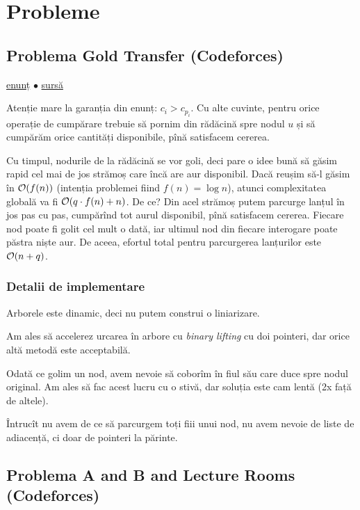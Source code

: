 \documentclass[../main.tex]{subfiles}
\begin{document}
\section{Probleme}

\subsection{Problema Gold Transfer (Codeforces)}
\label{problem:gold-transfer}

\href{https://codeforces.com/contest/1535/problem/E}{enunț}
$\bullet$
\hyperref[code:gold-transfer]{sursă}

Atenție mare la garanția din enunț: $c_i > c_{p_i}$. Cu alte cuvinte, pentru orice operație de cumpărare trebuie să pornim din rădăcină spre nodul $u$ și să cumpărăm orice cantități disponibile, pînă satisfacem cererea.

Cu timpul, nodurile de la rădăcină se vor goli, deci pare o idee bună să găsim rapid cel mai de jos strămoș care încă are aur disponibil. Dacă reușim să-l găsim în $\mathcal{O}(f(n))$ (intenția problemei fiind $f(n) = \log n$), atunci complexitatea globală va fi $\mathcal{O}(q \cdot f(n) + n)$. De ce? Din acel strămoș putem parcurge lanțul în jos pas cu pas, cumpărînd tot aurul disponibil, pînă satisfacem cererea. Fiecare nod poate fi golit cel mult o dată, iar ultimul nod din fiecare interogare poate păstra niște aur. De aceea, efortul total pentru parcurgerea lanțurilor este $\mathcal{O}(n + q)$.

\subsubsection*{Detalii de implementare}

Arborele este dinamic, deci nu putem construi o liniarizare.

Am ales să accelerez urcarea în arbore cu \textit{binary lifting} cu doi pointeri, dar orice altă metodă este acceptabilă.

Odată ce golim un nod, avem nevoie să coborîm în fiul său care duce spre nodul original. Am ales să  fac acest lucru cu o stivă, dar soluția este cam lentă (2x față de altele).

Întrucît nu avem de ce să parcurgem toți fiii unui nod, nu avem nevoie de liste de adiacență, ci doar de pointeri la părinte.

\subsection{Problema A and B and Lecture Rooms (Codeforces)}
\label{problem:a-and-b-and-lecture-rooms}
\end{document}
